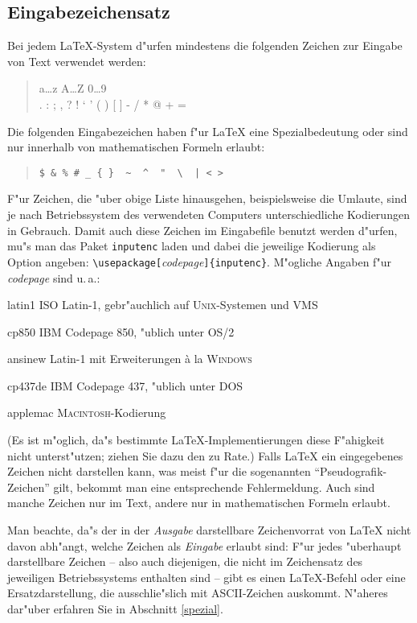 \subsection{Eingabezeichensatz}\label{inputenc}

Bei jedem \LaTeX-System d"urfen mindestens die folgenden
Zeichen zur Eingabe von Text verwendet werden:
\begin{quote}
  \ttfamily
  a\dots z A\dots Z 0\dots 9 \\
  . : ; , ? ! ` ' ( ) [ ] - / * @ + =
\end{quote}
Die folgenden Eingabezeichen haben f"ur \LaTeX{} eine Spezialbedeutung
oder sind nur innerhalb von mathematischen Formeln erlaubt:
\begin{quote}
\verb.$ & % # _ { }  ~  ^  "  \  | < >.
\end{quote}
F"ur Zeichen, die "uber obige Liste hinausgehen, beispielsweise die Umlaute,
sind je nach Betriebssystem des verwendeten Computers 
unterschiedliche Kodierungen in Gebrauch.  Damit auch diese Zeichen im 
Eingabe\-file benutzt werden d"urfen,  mu"s man das Paket 
\texttt{inputenc} laden und dabei die jeweilige Kodierung als 
Option angeben: \verb:\usepackage[:\textit{codepage}\verb:]{inputenc}:.
M"ogliche Angaben f"ur \textit{codepage} sind u.\,a.:
\begin{ttdescription}
  \item[latin1] ISO Latin-1, gebr"auchlich auf \textsc{Unix}-Systemen und VMS
  \item[cp850] IBM Codepage 850, "ublich unter OS/2
  \item[ansinew] Latin-1 mit Erweiterungen \`a la \textsc{Windows}
  \item[cp437de] IBM Codepage 437, "ublich unter DOS
  \item[applemac] \textsc{Macintosh}-Kodierung
\end{ttdescription}
(Es ist m"oglich, da"s bestimmte \LaTeX-Implementierungen
diese F"ahigkeit nicht unterst"utzen; ziehen Sie dazu den \local{} zu Rate.)
Falls \LaTeX{} ein eingegebenes Zeichen nicht darstellen
kann, was meist f"ur die sogenannten "`Pseudografik-Zeichen"' 
gilt,  bekommt man eine entsprechende Fehlermeldung.
Auch sind manche Zeichen nur im Text, andere nur in mathematischen 
Formeln erlaubt.

Man beachte, da"s der in der \emph{Ausgabe} darstellbare Zeichenvorrat 
von \LaTeX{} nicht davon abh"angt, welche Zeichen als \emph{Eingabe} erlaubt 
sind:
F"ur jedes "uberhaupt darstellbare Zeichen -- also auch diejenigen, die
nicht im Zeichensatz des jeweiligen Betriebssystems enthalten sind --
gibt es einen 
\LaTeX-Befehl oder eine Ersatzdarstellung, die ausschlie"slich mit 
ASCII-Zeichen auskommt.  N"aheres dar"uber erfahren Sie
in Abschnitt \ref{spezial}.



\endinput
